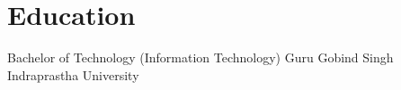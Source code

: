 \section{Education}
    \resumeSubHeadingListStart

    \resumeSubheading
    {Bachelor of Technology (Information Technology)}{}
    {Guru Gobind Singh Indraprastha University}{}

    \resumeSubHeadingListEnd